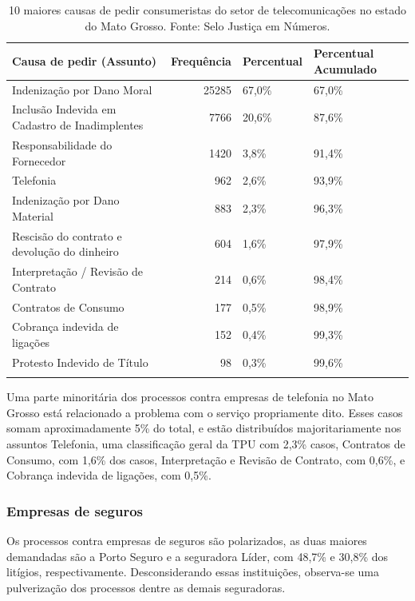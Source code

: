 \documentclass[]{report}
\begin{document}
\begin{longtable}{lrll}
\caption{10 maiores causas de pedir consumeristas do setor de telecomunicações no estado do Mato Grosso. Fonte: Selo Justiça em Números.} \\
  \hline
Causa de pedir (Assunto) & Frequência & Percentual & Percentual Acumulado \\
  \hline
Indenização por Dano Moral & 25285 & 67,0\% & 67,0\% \\
  Inclusão Indevida em Cadastro de Inadimplentes & 7766 & 20,6\% & 87,6\% \\
  Responsabilidade do Fornecedor & 1420 & 3,8\% & 91,4\% \\
  Telefonia & 962 & 2,6\% & 93,9\% \\
  Indenização por Dano Material & 883 & 2,3\% & 96,3\% \\
  Rescisão do contrato e devolução do dinheiro & 604 & 1,6\% & 97,9\% \\
  Interpretação / Revisão de Contrato & 214 & 0,6\% & 98,4\% \\
  Contratos de Consumo & 177 & 0,5\% & 98,9\% \\
  Cobrança indevida de ligações & 152 & 0,4\% & 99,3\% \\
  Protesto Indevido de Título &  98 & 0,3\% & 99,6\% \\
   \hline
\hline
\label{unnamed-chunk-48}
\end{longtable}

Uma parte minoritária dos processos contra empresas de telefonia no Mato
Grosso está relacionado a problema com o serviço propriamente dito.
Esses casos somam aproximadamente 5\% do total, e estão distribuídos
majoritariamente nos assuntos Telefonia, uma classificação geral da TPU
com 2,3\% casos, Contratos de Consumo, com 1,6\% dos casos,
Interpretação e Revisão de Contrato, com 0,6\%, e Cobrança indevida de
ligações, com 0,5\%.

\subsubsection{Empresas de seguros}\label{empresas-de-seguros-1}

Os processos contra empresas de seguros são polarizados, as duas maiores
demandadas são a Porto Seguro e a seguradora Líder, com 48,7\% e 30,8\%
dos litígios, respectivamente. Desconsiderando essas instituições,
observa-se uma pulverização dos processos dentre as demais seguradoras.
\end{document}
